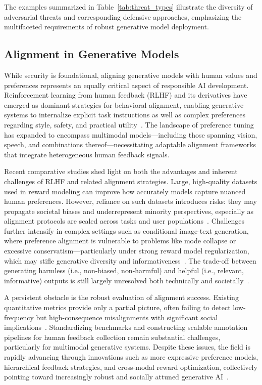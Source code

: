 \documentclass[sigconf]{acmart}
\begin{document}
The examples summarized in Table~\ref{tab:threat_types} illustrate the diversity of adversarial threats and corresponding defensive approaches, emphasizing the multifaceted requirements of robust generative model deployment.

\subsection{Alignment in Generative Models}

While security is foundational, aligning generative models with human values and preferences represents an equally critical aspect of responsible AI development. Reinforcement learning from human feedback (RLHF) and its derivatives have emerged as dominant strategies for behavioral alignment, enabling generative systems to internalize explicit task instructions as well as complex preferences regarding style, safety, and practical utility~\cite{ref69,ref75}. The landscape of preference tuning has expanded to encompass multimodal models—including those spanning vision, speech, and combinations thereof—necessitating adaptable alignment frameworks that integrate heterogeneous human feedback signals.

Recent comparative studies shed light on both the advantages and inherent challenges of RLHF and related alignment strategies. Large, high-quality datasets used in reward modeling can improve how accurately models capture nuanced human preferences. However, reliance on such datasets introduces risks: they may propagate societal biases and underrepresent minority perspectives, especially as alignment protocols are scaled across tasks and user populations~\cite{ref69}. Challenges further intensify in complex settings such as conditional image-text generation, where preference alignment is vulnerable to problems like mode collapse or excessive conservatism—particularly under strong reward model regularization, which may stifle generative diversity and informativeness~\cite{ref75}. The trade-off between generating harmless (i.e., non-biased, non-harmful) and helpful (i.e., relevant, informative) outputs is still largely unresolved both technically and societally~\cite{ref75}.

A persistent obstacle is the robust evaluation of alignment success. Existing quantitative metrics provide only a partial picture, often failing to detect low-frequency but high-consequence misalignments with significant social implications~\cite{ref75}. Standardizing benchmarks and constructing scalable annotation pipelines for human feedback collection remain substantial challenges, particularly for multimodal generative systems. Despite these issues, the field is rapidly advancing through innovations such as more expressive preference models, hierarchical feedback strategies, and cross-modal reward optimization, collectively pointing toward increasingly robust and socially attuned generative AI~\cite{ref69,ref75}.
\end{document}
